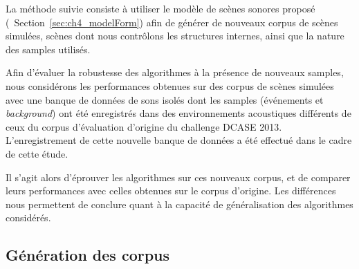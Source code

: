 La méthode suivie consiste à utiliser le modèle de scènes sonores proposé (\cf~Section~\ref{sec:ch4_modelForm}) afin de générer de nouveaux corpus de scènes simulées, scènes dont nous contrôlons les structures internes, ainsi que la nature des samples utilisés. 

Afin d'évaluer la robustesse des algorithmes à la présence de nouveaux samples, nous considérons les performances obtenues sur des corpus de scènes simulées avec une banque de données de sons isolés dont les samples (événements et \emph{background}) ont été enregistrés dans des environnements acoustiques différents de ceux du corpus d'évaluation d'origine du challenge DCASE 2013. L'enregistrement de cette nouvelle banque de données a été effectué dans le cadre de cette étude.

Il s'agit alors d'éprouver les algorithmes sur ces nouveaux corpus, et de comparer leurs performances avec celles obtenues sur le corpus d'origine. Les différences nous permettent de conclure quant à la capacité de généralisation des algorithmes considérés.

\subsection{Génération des corpus}

